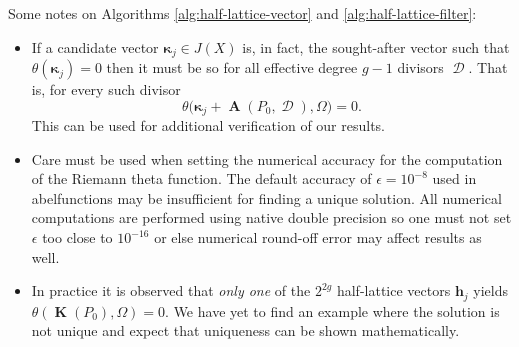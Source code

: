 \documentclass[12pt]{article}
\theoremstyle{definition}
\DeclareMathOperator{\DivD}{\mathcal{D}}
\DeclareMathOperator{\RCV}{\boldsymbol{K}}
\DeclareMathOperator{\Abel}{\boldsymbol{A}}
\begin{document}
Some notes on Algorithms \ref{alg:half-lattice-vector} and
\ref{alg:half-lattice-filter}:
\begin{itemize}
  \item If a candidate vector $\boldsymbol{\kappa}_j \in J(X)$ is, in
    fact, the sought-after vector such that
    $\theta(\boldsymbol{\kappa}_j) = 0$ then it must be so for all
    effective degree $g-1$ divisors $\DivD$. That is, for every such
    divisor
    \begin{equation}
      \theta\big(\boldsymbol{\kappa}_j + \Abel(P_0,\DivD), \Omega \big) = 0.
    \end{equation}
    This can be used for additional verification of our results.
  \item Care must be used when setting the numerical accuracy for the
    computation of the Riemann theta function. The default accuracy of
    $\epsilon = 10^{-8}$ used in {\sc abelfunctions} may be insufficient
    for finding a unique solution. All numerical computations are
    performed using native double precision so one must not set
    $\epsilon$ too close to $10^{-16}$ or else numerical round-off error
    may affect results as well.
  \item In practice it is observed that {\it only one} of the $2^{2g}$
    half-lattice vectors $\boldsymbol{h}_j$ yields
    $\theta(\RCV(P_0),\Omega) = 0$. We have yet to find an example where
    the solution is not unique and expect that uniqueness can be shown
    mathematically.
\end{itemize}
\end{document}
